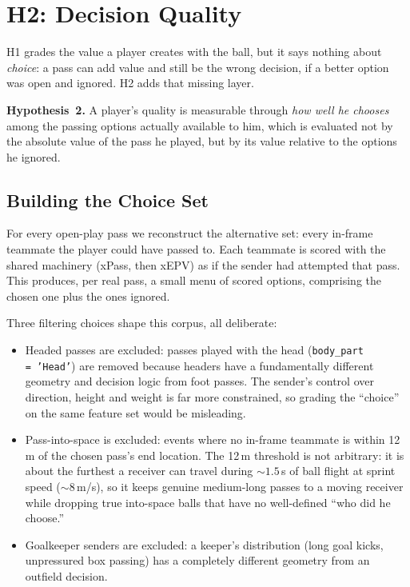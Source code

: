 \documentclass[12pt,a4paper]{article}
\begin{document}
\section{H2: Decision Quality}\label{sec:h2}

H1 grades the value a player creates with the ball, but it says nothing about \emph{choice}: a pass can add value and still be the wrong decision, if a better option was open and ignored. H2 adds that missing layer.

\textbf{Hypothesis~2.}
A player's quality is measurable through \emph{how well he chooses} among the passing options actually available to him, which is evaluated not by the absolute value of the pass he played, but by its value relative to the options he ignored.

\subsection{Building the Choice Set}\label{sec:choice-set}

For every open-play pass we reconstruct the alternative set: every in-frame teammate the player could have passed to.
Each teammate is scored with the shared machinery (xPass, then xEPV) as if the sender had attempted that pass.
This produces, per real pass, a small menu of scored options, comprising the chosen one plus the ones ignored.

Three filtering choices shape this corpus, all deliberate:
\begin{itemize}
    \item Headed passes are excluded: passes played with the head (\texttt{body\_part\,=\,'Head'}) are removed because headers have a fundamentally different geometry and decision logic from foot passes. The sender's control over direction, height and weight is far more constrained, so grading the ``choice'' on the same feature set would be misleading.
    \item Pass-into-space is excluded: events where no in-frame teammate is within 12\,m of the chosen pass's end location. The 12\,m threshold is not arbitrary: it is about the furthest a receiver can travel during ${\sim}1.5$\,s of ball flight at sprint speed (${\sim}8$\,m/s), so it keeps genuine medium-long passes to a moving receiver while dropping true into-space balls that have no well-defined ``who did he choose.''
    \item Goalkeeper senders are excluded: a keeper's distribution (long goal kicks, unpressured box passing) has a completely different geometry from an outfield decision.
\end{itemize}
\end{document}
